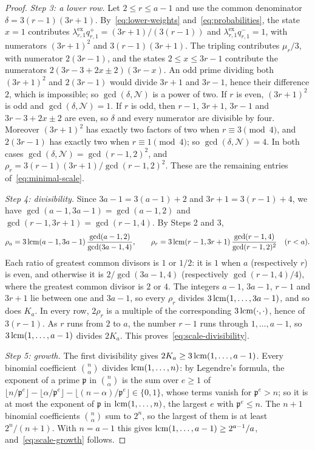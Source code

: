 \begin{proof}
\emph{Step 3: a lower row.} Let \(2\le r\le a-1\) and use the common
denominator \(\delta=3(r-1)(3r+1)\). By~\eqref{eq:lower-weights}
and~\eqref{eq:probabilities}, the state \(x=1\) contributes
\(\lambda^{\mathrm{ex}}_{r,1}q^+_{r,1}=(3r+1)/(3(r-1))\) and
\(\lambda^{\mathrm{ex}}_{r,1}q^-_{r,1}=1\), with numerators \((3r+1)^2\)
and \(3(r-1)(3r+1)\). The tripling contributes \(\mu_r/3\), with
numerator \(2(3r-1)\), and the states \(2\le x\le3r-1\) contribute the
numerators \(2(3r-3+2x\pm2)(3r-x)\). An odd prime dividing both
\((3r+1)^2\) and \(2(3r-1)\) would divide \(3r+1\) and \(3r-1\), hence
their difference \(2\), which is impossible; so
\(\gcd(\delta,\mathcal N)\) is a power of two. If \(r\) is even,
\((3r+1)^2\) is odd and \(\gcd(\delta,\mathcal N)=1\). If \(r\) is odd,
then \(r-1\), \(3r+1\), \(3r-1\) and \(3r-3+2x\pm2\) are even, so
\(\delta\) and every numerator are divisible by four. Moreover
\((3r+1)^2\) has exactly two factors of two when \(r\equiv3\pmod4\), and
\(2(3r-1)\) has exactly two when \(r\equiv1\pmod4\); so
\(\gcd(\delta,\mathcal N)=4\). In both cases
\(\gcd(\delta,\mathcal N)=\gcd(r-1,2)^2\), and
\(\rho_r=3(r-1)(3r+1)/\gcd(r-1,2)^2\). These are the remaining entries
of~\eqref{eq:minimal-scale}.

\emph{Step 4: divisibility.} Since \(3a-1=3(a-1)+2\) and
\(3r+1=3(r-1)+4\), we have \(\gcd(a-1,3a-1)=\gcd(a-1,2)\) and
\(\gcd(r-1,3r+1)=\gcd(r-1,4)\). By Steps 2 and 3,
\[
 \rho_a=3\operatorname{lcm}(a-1,3a-1)\,\frac{\gcd(a-1,2)}{\gcd(3a-1,4)},\qquad
 \rho_r=3\operatorname{lcm}(r-1,3r+1)\,\frac{\gcd(r-1,4)}{\gcd(r-1,2)^2}
 \quad(r<a).
\]
Each ratio of greatest common divisors is \(1\) or \(1/2\): it is \(1\)
when \(a\) (respectively \(r\)) is even, and otherwise it is
\(2/\gcd(3a-1,4)\) (respectively \(\gcd(r-1,4)/4\)), where the greatest
common divisor is \(2\) or \(4\). The integers \(a-1\), \(3a-1\), \(r-1\)
and \(3r+1\) lie between one and \(3a-1\), so every \(\rho_r\) divides
\(3\operatorname{lcm}(1,\ldots,3a-1)\), and so does \(K_a\). In every row, \(2\rho_r\)
is a multiple of the corresponding \(3\operatorname{lcm}(\cdot,\cdot)\), hence of
\(3(r-1)\). As \(r\) runs from \(2\) to \(a\), the number \(r-1\) runs
through \(1,\ldots,a-1\), so \(3\operatorname{lcm}(1,\ldots,a-1)\) divides \(2K_a\).
This proves~\eqref{eq:scale-divisibility}.

\emph{Step 5: growth.} The first divisibility gives
\(2K_a\ge3\operatorname{lcm}(1,\ldots,a-1)\). Every binomial coefficient
\(\binom n\alpha\) divides \(\operatorname{lcm}(1,\ldots,n)\): by Legendre's formula,
the exponent of a prime \(\mathfrak p\) in \(\binom n\alpha\) is the sum
over \(e\ge1\) of
\(\lfloor n/\mathfrak p^e\rfloor-\lfloor\alpha/\mathfrak p^e\rfloor
-\lfloor(n-\alpha)/\mathfrak p^e\rfloor\in\{0,1\}\), whose terms vanish
for \(\mathfrak p^e>n\); so it is at most the exponent of \(\mathfrak p\)
in \(\operatorname{lcm}(1,\ldots,n)\), the largest \(e\) with \(\mathfrak p^e\le n\).
The \(n+1\) binomial
coefficients \(\binom n\alpha\) sum to \(2^n\), so the largest of them is
at least \(2^n/(n+1)\). With \(n=a-1\) this gives
\(\operatorname{lcm}(1,\ldots,a-1)\ge2^{a-1}/a\), and~\eqref{eq:scale-growth} follows.
\end{proof}

